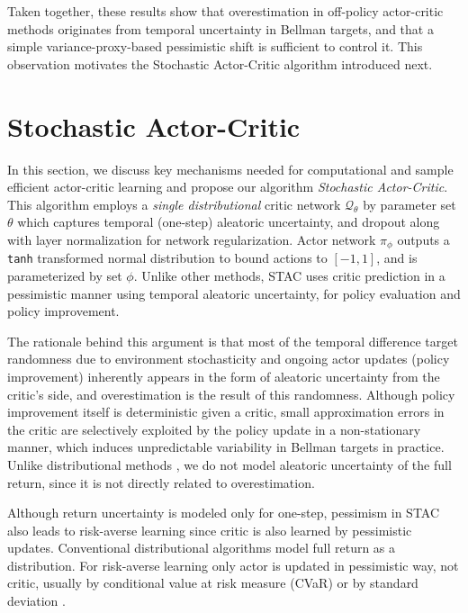 \documentclass{article}
\begin{document}
Taken together, these results show that overestimation in off-policy actor-critic methods originates from temporal uncertainty in Bellman targets, and that a simple variance-proxy-based pessimistic shift is sufficient to control it. This observation motivates the Stochastic Actor-Critic algorithm introduced next.

\section{Stochastic Actor-Critic}
\label{sec:stac}

In this section, we discuss key mechanisms needed for computational and sample efficient actor-critic learning and propose our algorithm \textit{Stochastic Actor-Critic}. This algorithm employs a \textit{single distributional} critic network $\mathcal{Q}_{\theta}$ by parameter set $\theta$ which captures temporal (one-step) aleatoric uncertainty, and dropout along with layer normalization for network regularization. Actor network $\pi_{\phi}$ outputs a \verb|tanh| transformed normal distribution to bound actions to $[-1, 1]$, and is parameterized by set $\phi$. Unlike other methods, STAC uses critic prediction in a pessimistic manner using temporal aleatoric uncertainty, for policy evaluation and policy improvement. 

The rationale behind this argument is that most of the temporal difference target randomness due to environment stochasticity and ongoing actor updates (policy improvement) inherently appears in the form of aleatoric uncertainty from the critic's side, and overestimation is the result of this randomness. Although policy improvement itself is deterministic given a critic, small approximation errors in the critic are selectively exploited by the policy update in a non-stationary manner, which induces unpredictable variability in Bellman targets in practice. Unlike distributional methods \citep{bellemare2017distributional}, we do not model aleatoric uncertainty of the full return, since it is not directly related to overestimation.

Although return uncertainty is modeled only for one-step, pessimism in STAC also leads to risk-averse learning since critic is also learned by pessimistic updates. Conventional distributional algorithms model full return as a distribution. For risk-averse learning only actor is updated in pessimistic way, not critic, usually by conditional value at risk measure (CVaR) \citep{dabney2018implicit, tang2019worst, yang2021wcsac, kim2022efficient, ma2025dsac} or by standard deviation \citep{ma2025dsac}. 
\end{document}
